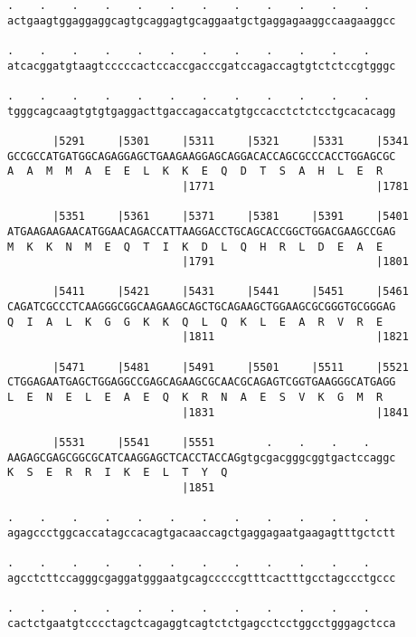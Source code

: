 \documentclass{article}
\begin{document}
\begin{Verbatim}
.    .    .    .    .    .    .    .    .    .    .    .    
actgaagtggaggaggcagtgcaggagtgcaggaatgctgaggagaaggccaagaaggcc
                                                            
.    .    .    .    .    .    .    .    .    .    .    .    
atcacggatgtaagtcccccactccaccgacccgatccagaccagtgtctctccgtgggc
                                                            
.    .    .    .    .    .    .    .    .    .    .    .    
tgggcagcaagtgtgtgaggacttgaccagaccatgtgccacctctctcctgcacacagg
                                                            
       |5291     |5301     |5311     |5321     |5331     |5341
GCCGCCATGATGGCAGAGGAGCTGAAGAAGGAGCAGGACACCAGCGCCCACCTGGAGCGC
A  A  M  M  A  E  E  L  K  K  E  Q  D  T  S  A  H  L  E  R  
                           |1771                         |1781
  
       |5351     |5361     |5371     |5381     |5391     |5401
ATGAAGAAGAACATGGAACAGACCATTAAGGACCTGCAGCACCGGCTGGACGAAGCCGAG
M  K  K  N  M  E  Q  T  I  K  D  L  Q  H  R  L  D  E  A  E  
                           |1791                         |1801
  
       |5411     |5421     |5431     |5441     |5451     |5461
CAGATCGCCCTCAAGGGCGGCAAGAAGCAGCTGCAGAAGCTGGAAGCGCGGGTGCGGGAG
Q  I  A  L  K  G  G  K  K  Q  L  Q  K  L  E  A  R  V  R  E  
                           |1811                         |1821
  
       |5471     |5481     |5491     |5501     |5511     |5521
CTGGAGAATGAGCTGGAGGCCGAGCAGAAGCGCAACGCAGAGTCGGTGAAGGGCATGAGG
L  E  N  E  L  E  A  E  Q  K  R  N  A  E  S  V  K  G  M  R  
                           |1831                         |1841
  
       |5531     |5541     |5551        .    .    .    .    
AAGAGCGAGCGGCGCATCAAGGAGCTCACCTACCAGgtgcgacgggcggtgactccaggc
K  S  E  R  R  I  K  E  L  T  Y  Q                          
                           |1851                            
  
.    .    .    .    .    .    .    .    .    .    .    .    
agagccctggcaccatagccacagtgacaaccagctgaggagaatgaagagtttgctctt
                                                            
.    .    .    .    .    .    .    .    .    .    .    .    
agcctcttccagggcgaggatgggaatgcagcccccgtttcactttgcctagccctgccc
                                                            
.    .    .    .    .    .    .    .    .    .    .    .    
cactctgaatgtcccctagctcagaggtcagtctctgagcctcctggcctgggagctcca
                                                            

\end{Verbatim}
\end{document}
